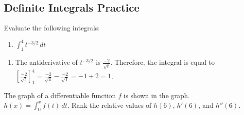 \subsection{Definite Integrals Practice}
\begin{Exercise}[label=FTC2]
	Evaluate the following integrals:
	\begin{enumerate}
	\item $\int_1^4 t^{-3/2}\,dt$
	\end{enumerate}
\end{Exercise}

\begin{Answer}[ref=FTC2]
	\begin{enumerate}
	\item The antiderivative of $t^{-3/2}$ is $\frac{-2}{\sqrt{t}}$. Therefore, the integral is equal to $[\frac{-2}{\sqrt{t}}]_1^4 = \frac{-2}{\sqrt{4}} - \frac{-2}{\sqrt{1}} = -1 + 2 = 1$. 
	\end{enumerate}
\end{Answer}

\begin{Exercise} The graph of a differentiable function $f$ is shown in the graph. $h(x) = \int_0^x f(t)\,dt$. Rank the relative values of $h(6)$, $h'(6)$, and $h''(6)$. 
	
\end{Exercise}

\begin{Answer}[ref=FTC3]

\end{Answer}





